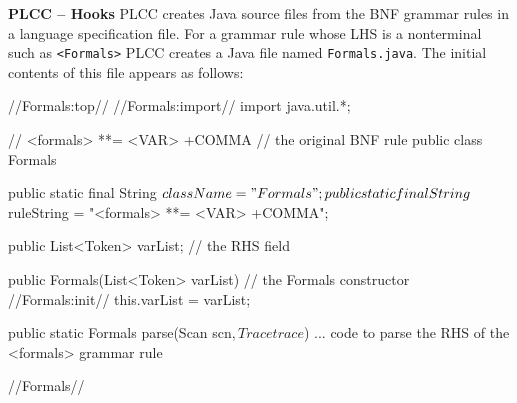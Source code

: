 \begin{minipage}[t]{\sw}
\slidenumber
\LARGE
{\bf PLCC -- Hooks}\exx
PLCC creates Java source files
from the BNF grammar rules in a language specification file.
For a grammar rule whose LHS is a nonterminal such as \verb'<Formals>'
PLCC creates a Java file named \verb'Formals.java'.
The initial contents of this file appears as follows:
{\large
\begin{qv}
//Formals:top//
//Formals:import//
import java.util.*;

// <formals> **= <VAR> +COMMA // the original BNF rule 
public class Formals {

    public static final String $className = "Formals";
    public static final String $ruleString = "<formals> **= <VAR> +COMMA";

    public List<Token> varList; // the RHS field

    public Formals(List<Token> varList) { // the Formals constructor
//Formals:init//
        this.varList = varList;
    }

    public static Formals parse(Scan scn$, Trace trace$) {
        ... code to parse the RHS of the <formals> grammar rule
    }

//Formals//
}
\end{qv}
}
\end{minipage}
\clearpage
